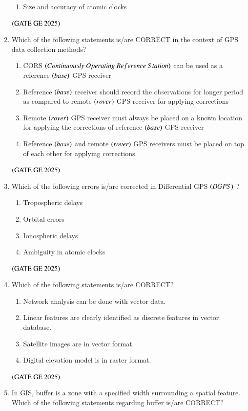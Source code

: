 \documentclass[journal,12pt,onecolumn]{IEEEtran}
\theoremstyle{remark}
\begin{document}
\begin{enumerate}
\begin{enumerate}
\item Size and accuracy of atomic clocks
\end{enumerate}
\hfill $\left(\text{GATE GE 2025}\right)$
\bigskip
\item Which of the following statements is/are CORRECT in the context of GPS data collection methods?
\begin{enumerate}
\item CORS $\brak{Continuously\ Operating\ Reference\ Station}$ can be used as a reference $\left(base\right)$ GPS receiver
\item Reference $\left(base\right)$ receiver should record the observations for longer period as compared to remote $\left(rover\right)$ GPS receiver for applying corrections
\item Remote $\left(rover\right)$ GPS receiver must always be placed on a known location for applying the corrections of reference $\left(base\right)$ GPS receiver
\item Reference $\left(base\right)$ and remote $\left(rover\right)$ GPS receivers must be placed on top of each other for applying corrections
\end{enumerate}
\hfill $\left(\text{GATE GE 2025}\right)$
\bigskip
\item Which of the following errors is/are corrected in Differential GPS $\left(DGPS\right)$ ?
\begin{enumerate}
\item Tropospheric delays
\item Orbital errors
\item Ionospheric delays
\item Ambiguity in atomic clocks
\end{enumerate}
\hfill $\left(\text{GATE GE 2025}\right)$
\bigskip
\item Which of the following statements is/are CORRECT?
\begin{enumerate}
\item Network analysis can be done with vector data.
\item Linear features are clearly identified as discrete features in vector database.
\item Satellite images are in vector format.
\item Digital elevation model is in raster format.
\end{enumerate}
\hfill $\left(\text{GATE GE 2025}\right)$
\bigskip
\item In GIS, buffer is a zone with a specified width surrounding a spatial feature.
Which of the following statements regarding buffer is/are CORRECT?

\end{enumerate}
\end{document}
